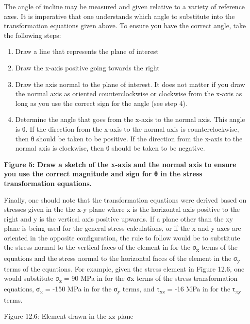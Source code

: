 \documentclass[
  letterpaper,
  DIV=11,
  numbers=noendperiod]{scrreprt}
\begin{document}
The angle of incline may be measured and given relative to a variety of
reference axes. It is imperative that one understands which angle to
substitute into the transformation equations given above. To ensure you
have the correct angle, take the following steps:

\begin{enumerate}
\def\labelenumi{\arabic{enumi}.}
\item
  Draw a line that represents the plane of interest
\item
  Draw the x-axis positive going towards the right
\item
  Draw the axis normal to the plane of interest. It does not matter if
  you draw the normal axis as oriented counterclockwise or clockwise
  from the x-axis as long as you use the correct sign for the angle (see
  step 4).
\item
  Determine the angle that goes from the x-axis to the normal axis. This
  angle is θ. If the direction from the x-axis to the normal axis is
  counterclockwise, then θ should be taken to be positive. If the
  direction from the x-axis to the normal axis is clockwise, then θ
  should be taken to be negative.
\end{enumerate}

\textbf{Figure 5: Draw a sketch of the x-axis and the normal axis to
ensure you use the correct magnitude and sign for θ in the stress
transformation equations.}

Finally, one should note that the transformation equations were derived
based on stresses given in the the x-y plane where x is the horizontal
axis positive to the right and y is the vertical axis positive upwards.
If a plane other than the xy plane is being used for the general stress
calculations, or if the x and y axes are oriented in the opposite
configuration, the rule to follow would be to substitute the stress
normal to the vertical faces of the element in for the
σ\textsubscript{x} terms of the equations and the stress normal to the
horizontal faces of the element in the σ\textsubscript{y} terms of the
equations. For example, given the stress element in Figure 12.6, one
would substitute σ\textsubscript{z} = 90 MPa in for the σx terms of the
stress transformation equations, σ\textsubscript{x} = -150 MPa in for
the σ\textsubscript{y} terms, and τ\textsubscript{xz} = -16 MPa in for
the τ\textsubscript{xy} terms.

Figure 12.6: Element drawn in the xz plane
\end{document}
